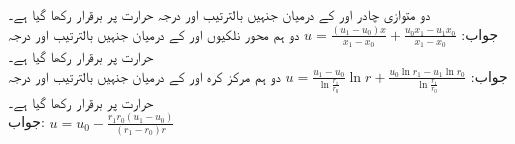 \quad
دو متوازی چادر  اور  کے درمیان جنہیں بالترتیب  اور  درجہ حرارت پر برقرار رکھا گیا ہے۔\\
جواب:\quad
$u=\tfrac{(u_1-u_0)x}{x_1-x_0}+\tfrac{u_0x_1-u_1x_0}{x_1-x_0}$
\quad
دو ہم محور نلکیوں  اور  کے درمیان جنہیں بالترتیب  اور  درجہ حرارت پر برقرار رکھا گیا ہے۔\\
جواب:\quad
$u=\tfrac{u_1-u_0}{\ln \tfrac{r_1}{r_0}}\ln r+\tfrac{u_0\ln r_1-u_1\ln r_0}{\ln \tfrac{r_1}{r_0}}$
\quad
دو ہم مرکز کرہ   اور  کے درمیان جنہیں بالترتیب  اور  درجہ حرارت پر برقرار رکھا گیا ہے۔\\
جواب:\quad
$u=u_0-\tfrac{r_1r_0(u_1-u_0)}{(r_1-r_0)r}$

